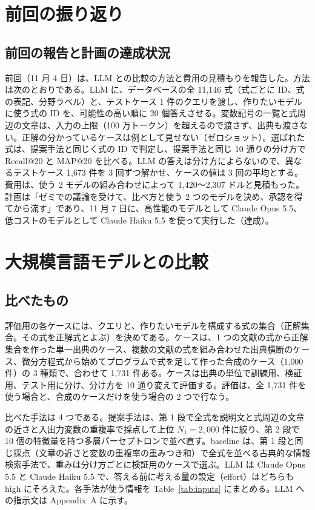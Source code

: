 \documentclass[a4j,dvipdfmx,10pt]{jresume}
\begin{document}
\section{前回の振り返り}
\subsection{前回の報告と計画の達成状況}
前回（11 月 4 日）は、LLM との比較の方法と費用の見積もりを報告した。方法は次のとおりである。LLM に、データベースの全 11{,}146 式（式ごとに ID、式の表記、分野ラベル）と、テストケース 1 件のクエリを渡し、作りたいモデルに使う式の ID を、可能性の高い順に 20 個答えさせる。変数記号の一覧と式周辺の文章は、入力の上限（100 万トークン）を超えるので渡さず、出典も渡さない。正解の分かっているケースは例として見せない（ゼロショット）。選ばれた式は、提案手法と同じく式の ID で判定し、提案手法と同じ 10 通りの分け方で Recall@20 と MAP@20 を比べる。LLM の答えは分け方によらないので、異なるテストケース 1{,}673 件を 3 回ずつ解かせ、ケースの値は 3 回の平均とする。費用は、使う 2 モデルの組み合わせによって 1{,}420〜2{,}307 ドルと見積もった。計画は「ゼミでの議論を受けて、比べ方と使う 2 つのモデルを決め、承認を得てから流す」であり、11 月 7 日に、高性能のモデルとして Claude Opus 5.5、低コストのモデルとして Claude Haiku 5.5 を使って実行した（達成）。


\section{大規模言語モデルとの比較}\label{sec:body}
\subsection{比べたもの}
評価用の各ケースには、クエリと、作りたいモデルを構成する式の集合（正解集合。その式を正解式とよぶ）を決めてある。ケースは、1 つの文献の式から正解集合を作った単一出典のケース、複数の文献の式を組み合わせた出典横断のケース、微分方程式から始めてプログラムで式を足して作った合成のケース（1{,}000 件）の 3 種類で、合わせて 1{,}731 件ある。ケースは出典の単位で訓練用、検証用、テスト用に分け、分け方を 10 通り変えて評価する。評価は、全 1{,}731 件を使う場合と、合成のケースだけを使う場合の 2 つで行なう。

比べた手法は 4 つである。提案手法は、第 1 段で全式を説明文と式周辺の文章の近さと入出力変数の重複率で採点して上位 $N_1 = 2{,}000$ 件に絞り、第 2 段で 10 個の特徴量を持つ多層パーセプトロンで並べ直す。baseline は、第 1 段と同じ採点（文章の近さと変数の重複率の重みつき和）で全式を並べる古典的な情報検索手法で、重みは分け方ごとに検証用のケースで選ぶ。LLM は Claude Opus 5.5 と Claude Haiku 5.5 で、答える前に考える量の設定（effort）はどちらも high にそろえた。各手法が使う情報を Table~\ref{tab:inputs} にまとめる。LLM への指示文は Appendix~A に示す。
\end{document}
